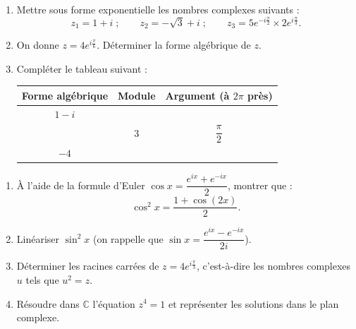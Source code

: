 \documentclass[11pt]{article}
\begin{document}
\begin{exercice}
\begin{enumerate}
\item Mettre sous forme exponentielle les nombres complexes suivants :
\[ z_1 = 1 + i \;; \qquad z_2 = -\sqrt{3} + i \;; \qquad z_3 = 5e^{-i\frac{\pi}{2}} \times 2e^{i\frac{\pi}{3}}. \]
\item On donne $z = 4e^{i\frac{\pi}{6}}$. Déterminer la forme algébrique de $z$.
\item Compléter le tableau suivant :
\begin{center}
\begin{tabular}{|c|c|c|}
\hline
Forme algébrique & Module & Argument (à $2\pi$ près) \\
\hline
$1 - i$ & & \\
\hline
 & $3$ & $\dfrac{\pi}{2}$ \\
\hline
$-4$ & & \\
\hline
\end{tabular}
\end{center}
\end{enumerate}
\end{exercice}

\begin{exercice}
\begin{enumerate}
\item À l'aide de la formule d'Euler $\cos x = \dfrac{e^{ix} + e^{-ix}}{2}$, montrer que :
\[ \cos^2 x = \frac{1 + \cos(2x)}{2}. \]
\item Linéariser $\sin^2 x$ (on rappelle que $\sin x = \dfrac{e^{ix} - e^{-ix}}{2i}$).
\item Déterminer les racines carrées de $z = 4e^{i\frac{\pi}{3}}$, c'est-à-dire les nombres complexes $u$ tels que $u^2 = z$.
\item Résoudre dans $\mathbb{C}$ l'équation $z^4 = 1$ et représenter les solutions dans le plan complexe.
\end{enumerate}
\end{exercice}
\end{document}

